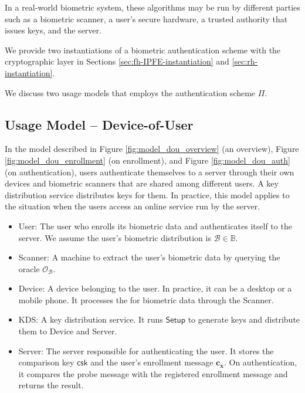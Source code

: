 In a real-world biometric system, these algorithms may be run by different parties such as a biometric scanner, a user's secure hardware, a trusted authority that issues keys, and the server.

We provide two instantiations of a biometric authentication scheme with the cryptographic layer in Sections \ref{sec:fh-IPFE-instantiation} and \ref{sec:rh-instantiation}.



\iffalse

We discuss two usage models that employs the authentication scheme $\Pi$.


\subsection{Usage Model – Device-of-User}
\label{sec:dou_model}

In the model described in Figure \ref{fig:model_dou_overview} (an overview), Figure \ref{fig:model_dou_enrollment} (on enrollment), and Figure \ref{fig:model_dou_auth} (on authentication), users authenticate themselves to a server through their own devices and biometric scanners that are shared among different users.
A key distribution service distributes keys for them. In practice, this model applies to the situation when the users access an online service run by the server.

\begin{itemize}

	\item \textsf{User}: The user who enrolls its biometric data and authenticates itself to the server. We assume the user's biometric distribution is $\mathcal{B} \in \mathbb{B}$. 

	\item \textsf{Scanner}: A machine to extract the user's biometric data by querying the oracle $\mathcal{O}_{\mathcal{B}}$.
	
	\item \textsf{Device}: A device belonging to the user. In practice, it can be a desktop or a mobile phone. It processes the  for biometric data through the \textsf{Scanner}.
	
	\item \textsf{KDS}: A key distribution service. It runs $\mathsf{Setup}$ to generate keys and distribute them to \textsf{Device} and \textsf{Server}.
		
	\item \textsf{Server}: The server responsible for authenticating the user. It stores the comparison key $\mathsf{csk}$ and the user's enrollment message $\mathbf{c_x}$. On authentication, it compares the probe message with the registered enrollment message and returns the result.  

\end{itemize}

